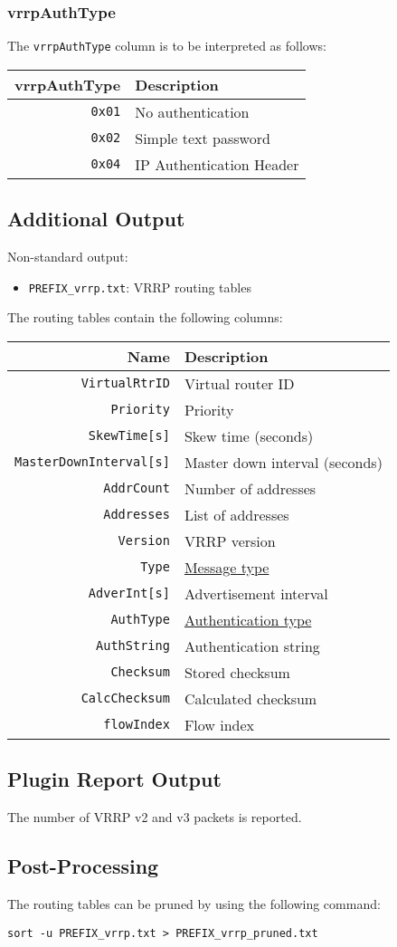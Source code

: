 \documentclass[documentation]{subfiles}
\begin{document}
\subsubsection{vrrpAuthType}\label{vrrpAuthType}
The {\tt vrrpAuthType} column is to be interpreted as follows:
\begin{longtable}{rl}
    \toprule
    {\bf vrrpAuthType} & {\bf Description}\\
    \midrule\endhead%
    {\tt 0x01} & No authentication\\
    {\tt 0x02} & Simple text password\\
    {\tt 0x04} & IP Authentication Header\\
    \bottomrule
\end{longtable}

\subsection{Additional Output}
Non-standard output:
\begin{itemize}
    \item {\tt PREFIX\_vrrp.txt}: VRRP routing tables
\end{itemize}
The routing tables contain the following columns:
\begin{longtable}{rl}
    \toprule
    {\bf Name} & {\bf Description}\\
    \midrule\endhead%
    {\tt VirtualRtrID}          & Virtual router ID\\
    {\tt Priority}              & Priority\\
    {\tt SkewTime[s]}           & Skew time (seconds)\\
    {\tt MasterDownInterval[s]} & Master down interval (seconds)\\
    {\tt AddrCount}             & Number of addresses\\
    {\tt Addresses}             & List of addresses\\
    {\tt Version}               & VRRP version\\
    {\tt Type}                  & \hyperref[vrrpType]{Message type}\\
    {\tt AdverInt[s]}           & Advertisement interval\\
    {\tt AuthType}              & \hyperref[vrrpAuthType]{Authentication type}\\
    {\tt AuthString}            & Authentication string\\
    {\tt Checksum}              & Stored checksum\\
    {\tt CalcChecksum}          & Calculated checksum\\
    {\tt flowIndex}             & Flow index\\
    \bottomrule
\end{longtable}

\subsection{Plugin Report Output}
The number of VRRP v2 and v3 packets is reported.

\subsection{Post-Processing}
The routing tables can be pruned by using the following command:
\begin{verbatim}
sort -u PREFIX_vrrp.txt > PREFIX_vrrp_pruned.txt
\end{verbatim}
\end{document}

